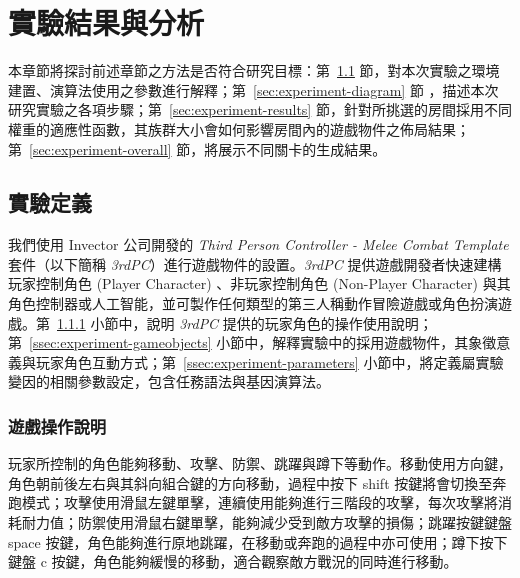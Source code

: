 \newcommand{\garesultstable}[5]{{
\begin{table}[H]
  \centering
  \caption{實驗 #2 - 共 #3 回合的最佳個體之標準化加權適應值}
  \label{tbl:result-of-experiment-#1}
  \bigskip
  \vspace{-5mm}
  \garesultssubtable{#4}
  \garesultssubtable{#5}
\end{table}
}}

\chapter{實驗結果與分析}
\label{cha:experiment}

本章節將探討前述章節之方法是否符合研究目標：第~\ref{sec:experiment-definition} 節，對本次實驗之環境建置、演算法使用之參數進行解釋；第~\ref{sec:experiment-diagram} 節
，描述本次研究實驗之各項步驟；第~\ref{sec:experiment-results} 節，針對所挑選的房間採用不同權重的適應性函數，其族群大小會如何影響房間內的遊戲物件之佈局結果；第~\ref{sec:experiment-overall} 節，將展示不同關卡的生成結果。

\section{實驗定義}
\label{sec:experiment-definition}

我們使用 Invector 公司開發的 \textit{Third Person Controller - Melee Combat Template} 套件（以下簡稱 \textit{3rdPC}）進行遊戲物件的設置。\textit{3rdPC} 提供遊戲開發者快速建構玩家控制角色 (Player Character) 、非玩家控制角色 (Non-Player Character) 與其角色控制器或人工智能，並可製作任何類型的第三人稱動作冒險遊戲或角色扮演遊戲。第~\ref{ssec:experiment-gameplaymanual} 小節中，說明 \textit{3rdPC} 提供的玩家角色的操作使用說明；第~\ref{ssec:experiment-gameobjects} 小節中，解釋實驗中的採用遊戲物件，其象徵意義與玩家角色互動方式；第~\ref{ssec:experiment-parameters} 小節中，將定義屬實驗變因的相關參數設定，包含任務語法與基因演算法。

\subsection{遊戲操作說明}
\label{ssec:experiment-gameplaymanual}

玩家所控制的角色能夠移動、攻擊、防禦、跳躍與蹲下等動作。移動使用方向鍵，角色朝前後左右與其斜向組合鍵的方向移動，過程中按下 shift 按鍵將會切換至奔跑模式；攻擊使用滑鼠左鍵單擊，連續使用能夠進行三階段的攻擊，每次攻擊將消耗耐力值；防禦使用滑鼠右鍵單擊，能夠減少受到敵方攻擊的損傷；跳躍按鍵鍵盤 space 按鍵，角色能夠進行原地跳躍，在移動或奔跑的過程中亦可使用；蹲下按下鍵盤 c 按鍵，角色能夠緩慢的移動，適合觀察敵方戰況的同時進行移動。

